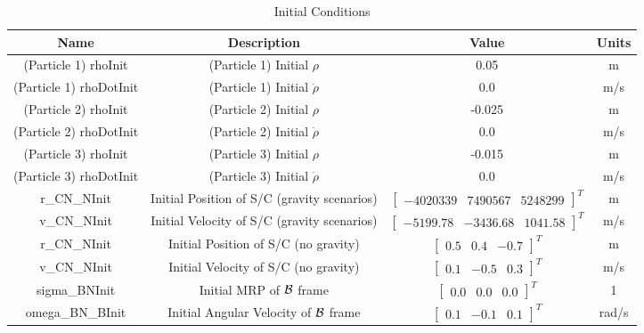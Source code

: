 \begin{table}[htbp]
	\caption{Initial Conditions}
	\label{tab:initial}
	\centering \fontsize{10}{10}\selectfont
	\begin{tabular}{| c | c | c | c |} %
		\hline
		\textbf{Name}  & \textbf{Description}  & \textbf{Value} & \textbf{Units} \\
		\hline
		(Particle 1) rhoInit  & (Particle 1) Initial $\rho$ & 0.05 & m \\
		\hline
		(Particle 1) rhoDotInit  & (Particle 1) Initial $\dot{\rho}$ & 0.0 & m/s \\
		\hline
		(Particle 2) rhoInit  & (Particle 2) Initial $\rho$ & -0.025 & m \\
		\hline
		(Particle 2) rhoDotInit  & (Particle 2) Initial $\dot{\rho}$ & 0.0 & m/s \\
		\hline
		(Particle 3) rhoInit  & (Particle 3) Initial $\rho$ & -0.015 & m \\
		\hline
		(Particle 3) rhoDotInit  & (Particle 3) Initial $\dot{\rho}$ & 0.0 & m/s \\
		\hline
		r\_CN\_NInit & Initial Position of S/C (gravity scenarios) & $\begin{bmatrix}
		-4020339 &	7490567 & 5248299 
		\end{bmatrix}^T$ & m \\
		\hline
		v\_CN\_NInit & Initial Velocity of S/C (gravity scenarios) & $\begin{bmatrix}
		-5199.78 & -3436.68 & 1041.58
		\end{bmatrix}^T$ & m/s \\
		\hline
		r\_CN\_NInit & Initial Position of S/C (no gravity) & $\begin{bmatrix}
		0.5 & 0.4 & -0.7 
		\end{bmatrix}^T$ & m \\
		\hline
		v\_CN\_NInit & Initial Velocity of S/C (no gravity) & $\begin{bmatrix}
		0.1 & -0.5 & 0.3
		\end{bmatrix}^T$ & m/s \\
		\hline
		sigma\_BNInit & Initial MRP of $\cal{B}$ frame & $\begin{bmatrix}
		0.0 & 0.0 & 0.0
		\end{bmatrix}^T$ & 1 \\
		\hline
		omega\_BN\_BInit & Initial Angular Velocity of $\cal{B}$ frame & $\begin{bmatrix}
		0.1 & -0.1 & 0.1
		\end{bmatrix}^T$ & rad/s \\
		\hline
	\end{tabular}
\end{table}

